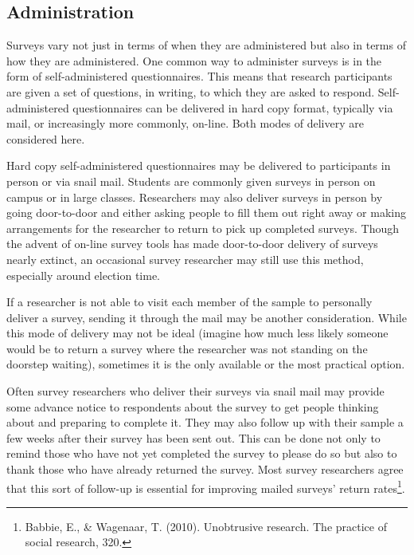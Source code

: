 \subsection{Administration}

Surveys vary not just in terms of when they are administered but also in terms of how they are administered. One common way to administer surveys is in the form of self-administered questionnaires. This means that research participants are given a set of questions, in writing, to which they are asked to respond. Self-administered questionnaires can be delivered in hard copy format, typically via mail, or increasingly more commonly, on-line. Both modes of delivery are considered here.

Hard copy self-administered questionnaires may be delivered to participants in person or via snail mail. Students are commonly given surveys in person on campus or in large classes. Researchers may also deliver surveys in person by going door-to-door and either asking people to fill them out right away or making arrangements for the researcher to return to pick up completed surveys. Though the advent of on-line survey tools has made door-to-door delivery of surveys nearly extinct, an occasional survey researcher may still use this method, especially around election time.

If a researcher is not able to visit each member of the sample to personally deliver a survey, sending it through the mail may be another consideration. While this mode of delivery may not be ideal (imagine how much less likely someone would be to return a survey where the researcher was not standing on the doorstep waiting), sometimes it is the only available or the most practical option.

Often survey researchers who deliver their surveys via snail mail may provide some advance notice to respondents about the survey to get people thinking about and preparing to complete it. They may also follow up with their sample a few weeks after their survey has been sent out. This can be done not only to remind those who have not yet completed the survey to please do so but also to thank those who have already returned the survey. Most survey researchers agree that this sort of follow-up is essential for improving mailed surveys’ return rates\footnote{Babbie, E., \& Wagenaar, T. (2010). Unobtrusive research. The practice of social research, 320.}.

